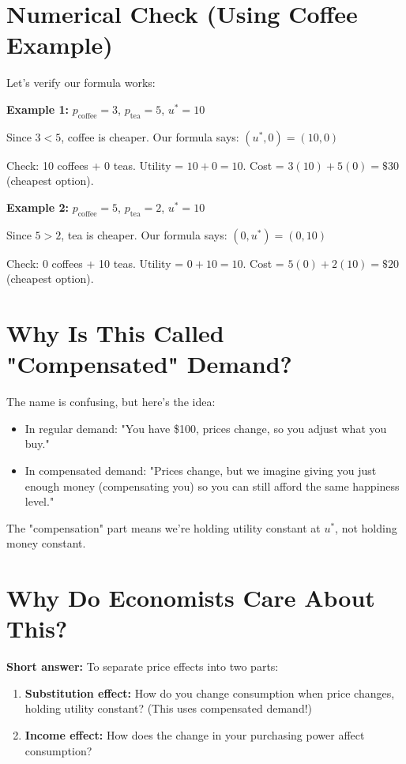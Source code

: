 \documentclass[11pt]{article}
\begin{document}
\section{Numerical Check (Using Coffee Example)}

Let's verify our formula works:

\textbf{Example 1:} $p_{\text{coffee}} = 3$, $p_{\text{tea}} = 5$, $u^* = 10$

Since $3 < 5$, coffee is cheaper. Our formula says: $(u^*, 0) = (10, 0)$

Check: 10 coffees + 0 teas. Utility = $10 + 0 = 10$. Cost = $3(10) + 5(0) = \$30$ (cheapest option).

\textbf{Example 2:} $p_{\text{coffee}} = 5$, $p_{\text{tea}} = 2$, $u^* = 10$

Since $5 > 2$, tea is cheaper. Our formula says: $(0, u^*) = (0, 10)$

Check: 0 coffees + 10 teas. Utility = $0 + 10 = 10$. Cost = $5(0) + 2(10) = \$20$ (cheapest option).

\section{Why Is This Called "Compensated" Demand?}

The name is confusing, but here's the idea:

\begin{itemize}
\item In regular demand: "You have \$100, prices change, so you adjust what you buy."
\item In compensated demand: "Prices change, but we imagine giving you just enough money (compensating you) so you can still afford the same happiness level."
\end{itemize}

The "compensation" part means we're holding utility constant at $u^*$, not holding money constant.

\section{Why Do Economists Care About This?}

\textbf{Short answer:} To separate price effects into two parts:

\begin{enumerate}
\item \textbf{Substitution effect:} How do you change consumption when price changes, holding utility constant? (This uses compensated demand!)
\item \textbf{Income effect:} How does the change in your purchasing power affect consumption?
\end{enumerate}
\end{document}
